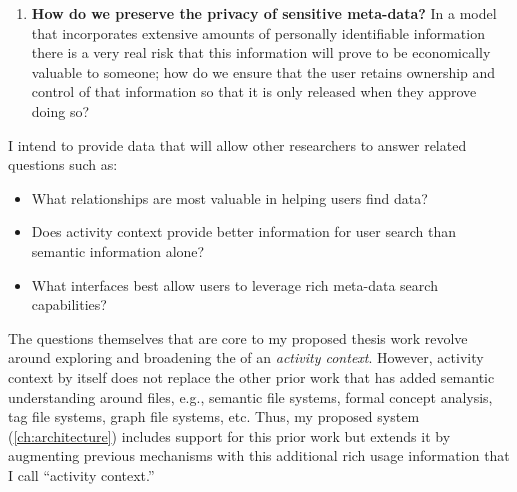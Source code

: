 \begin{enumerate}
    \item \label{rq:privacy} \textbf{How do we preserve the privacy of sensitive
              meta-data?} In a model that incorporates extensive amounts of personally
          identifiable information there is a very real risk that this information
          will prove to be economically valuable to someone; how do we ensure that the
          user retains ownership and control of that information so that it is only
          released when they approve doing so?

\end{enumerate}

I intend to provide data that will allow other researchers to answer related
questions such as:

\begin{itemize}
    \item What relationships are most valuable in helping users find data?
    \item Does activity context provide better information for user search than
          semantic information alone?
    \item What interfaces best allow users to leverage rich meta-data search
          capabilities?
\end{itemize}

The questions themselves that are core to my proposed thesis work revolve around
exploring and broadening the of an \emph{activity context}. However, activity
context by itself does not replace the other prior work that
has added semantic understanding around files, e.g., semantic file systems,
formal concept analysis, tag file systems, graph file systems, etc. Thus, my
proposed system (\autoref{ch:architecture}) includes support for this prior work
but extends it by augmenting previous mechanisms with this additional rich usage
information that I call ``activity context.''

\endinput

The goal of my research is to explore a number of key research questions.  One
of the complications involved in this work is that defending my thesis will best
involve work by others.  Thus, in this section I identify key research
questions; from these I then identify those that relate to those I propose
constructing as part of my thesis.  The goal of the other questions then is to
provide guidance as to what I envision as the usage model for this work.


